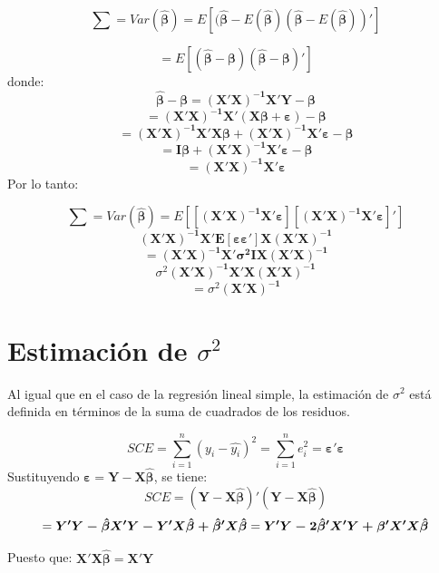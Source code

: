 \documentclass[
]{book}
\begin{document}
\[
\begin{equation}
\sum = Var(\boldsymbol{\hat{\beta}})=E[(\boldsymbol{\hat{\beta}}-E(\boldsymbol{\hat{\beta}})(\boldsymbol{\hat{\beta}}-E(\boldsymbol{\hat{\beta}}))']
\end{equation}
\]

\[
=E[(\boldsymbol{\hat{\beta}}-\boldsymbol{\beta})(\boldsymbol{\hat{\beta}}-\boldsymbol{\beta})']
\] donde: \[
\boldsymbol{\hat{\beta}-\beta=(X'X)^{-1}X'Y-\beta}
\] \[\boldsymbol{=(X'X)^{-1}X'(X\beta+\varepsilon)-\beta}\] \[\boldsymbol{=(X'X)^{-1}X'X\beta + (X'X)^{-1}X'                   \varepsilon-\beta}\] \[\boldsymbol{=I\beta+(X'X)^{-1}X'\varepsilon-\beta}\] \[=\boldsymbol{(X'X)^{-1}X'\varepsilon}\] Por lo tanto:

\[\sum=Var(\boldsymbol{\hat{\beta}})= E[[\boldsymbol{(X'X)^{-1}X'\varepsilon}][\boldsymbol{(X'X)^{-1}X'\varepsilon}]']\] \[\boldsymbol{(X'X)^{-1}X'E[\varepsilon\varepsilon']X(X'X)^{-1}}\] \[=\boldsymbol{(X'X)^{-1}X'\sigma^{2}IX(X'X)^{-1}}\] \[\sigma^{2}\boldsymbol{(X'X)^{-1}X'X(X'X)^{-1}}\] \[=\sigma^{2}\boldsymbol{(X'X)^{-1}}\]

\hypertarget{estimaciuxf3n-de-sigma2}{%
\section{\texorpdfstring{Estimación de \(\sigma^{2}\)}{Estimación de \textbackslash sigma\^{}\{2\}}}\label{estimaciuxf3n-de-sigma2}}

Al igual que en el caso de la regresión lineal simple, la estimación de \(\sigma^2\) está definida en términos de la suma de cuadrados de los residuos.

\[
\begin{equation}
SCE = \sum_{i=1}^{n}(y_{i}-\hat{y_{i}})^{2} = \sum_{i=1}^{n}e_{i}^{2} = \boldsymbol{\varepsilon'\varepsilon}
\label{eq:suma-error-cuadratico-regresion-lineal}
\end{equation}
\] Sustituyendo \(\boldsymbol{\varepsilon=Y-X\hat{\beta}}\), se tiene: \[
\begin{equation}
SCE = \boldsymbol{(Y-X\hat{\beta})'(Y-X\hat{\beta})}
\end{equation}
\] \[
\begin{equation}
=\boldsymbol{Y'Y - \hat{\beta}X'Y-Y'X\hat{\beta}+\hat{\beta} 'X\hat{\beta}} \\
= \boldsymbol{Y'Y-2\hat{\beta}'X'Y+\beta'X'X\hat{\beta}}
\end{equation}
\]

Puesto que: \(\boldsymbol{X'X\hat{\beta}=X'Y}\)
\end{document}
